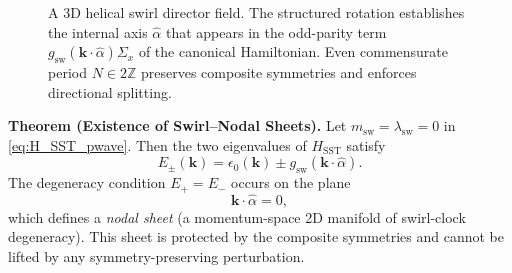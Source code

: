 \documentclass[10pt,reprint,aps,onecolumn,nofootinbib]{revtex4-2}
\begin{document}
            \begin{figure}[t]
                \centering
                \caption{
                    A 3D helical swirl director field. The structured rotation establishes the
                    internal axis $\hat{\alpha}$ that appears in the odd-parity term
                    $g_{\mathrm{sw}}(\mathbf{k}\!\cdot\!\hat{\alpha})\Sigma_x$ of the canonical
                    Hamiltonian. Even commensurate period $N\in2\mathbb{Z}$ preserves composite
                    symmetries and enforces directional splitting.
                }
            \end{figure}

    \medskip
            \noindent
            \textbf{Theorem (Existence of Swirl–Nodal Sheets).}
            Let $m_{\text{sw}} = \lambda_{\text{sw}}=0$ in \eqref{eq:H_SST_pwave}. Then the
            two eigenvalues of $H_{\text{SST}}$ satisfy
            \begin{equation}
                E_{\pm}(\mathbf{k}) = \epsilon_0(\mathbf{k}) \pm g_{\text{sw}}(\mathbf{k}\cdot\hat{\alpha}).
            \end{equation}
            The degeneracy condition $E_{+}=E_{-}$ occurs on the plane
            \begin{equation}
                \mathbf{k}\cdot\hat{\alpha} = 0,
            \end{equation}
            which defines a \emph{nodal sheet} (a momentum-space 2D manifold of
swirl-clock degeneracy). This sheet is protected by the composite symmetries
            and cannot be lifted by any symmetry-preserving perturbation.
\end{document}
